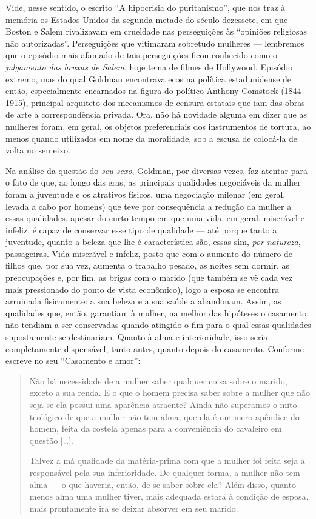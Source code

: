 Vide, nesse sentido, o escrito ``A
hipocrisia do puritanismo'', que nos traz à memória os Estados Unidos da
segunda metade do século dezessete, em que Boston e Salem rivalizavam em
crueldade nas perseguições às ``opiniões religiosas não autorizadas''. 
Perseguições que vitimaram sobretudo mulheres --- lembremos que o
episódio mais afamado de tais perseguições ficou conhecido como o
\textit{julgamento das bruxas de Salem}, hoje tema de filmes de Hollywood.
Episódio extremo, mas do qual Goldman encontrava ecos na política
estadunidense de então, especialmente encarnados na figura do político
Anthony Comstock (1844--1915), principal arquiteto dos mecanismos de
censura estatais que iam das obras de arte à correspondência privada.
Ora, não há novidade alguma em dizer que as mulheres foram, em geral, os
objetos preferenciais dos instrumentos de tortura, ao menos quando
utilizados em nome da moralidade, sob a escusa de colocá-la de volta no
seu eixo.

Na análise da questão do \textit{seu sexo}, Goldman, por diversas vezes, faz
atentar para o fato de que, ao longo das eras, as principais qualidades
negociáveis da mulher foram a juventude e os atrativos físicos, uma
negociação milenar (em geral, levada a cabo por homens) que teve por
consequência a redução da mulher a essas qualidades, apesar do curto
tempo em que uma vida, em geral, miserável e infeliz, é capaz de
conservar esse tipo de qualidade --- até porque tanto a juventude, quanto
a beleza que lhe é característica são, essas sim, \textit{por natureza},
passageiras. Vida miserável e infeliz, posto que com o aumento do número
de filhos que, por sua vez, aumenta o trabalho pesado, as noites sem
dormir, as preocupações e, por fim, as brigas com o marido (que também
se vê cada vez mais pressionado do ponto de vista econômico), logo a
esposa se encontra arruinada fisicamente: a sua beleza e a sua saúde a
abandonam. Assim, as qualidades que, então, garantiam à mulher, na
melhor das hipóteses o casamento, não tendiam a ser conservadas quando
atingido o fim para o qual essas qualidades supostamente se destinariam.
Quanto à alma e interioridade, isso seria completamente dispensável,
tanto antes, quanto depois do casamento. Conforme escreve no seu
``Casamento e amor'':

\begin{quote}
Não há necessidade de a mulher saber qualquer coisa sobre o marido,
exceto a sua renda. E o que o homem precisa saber sobre a mulher que não
seja se ela possui uma aparência atraente? Ainda não superamos o mito
teológico de que a mulher não tem alma, que ela é um mero apêndice do
homem, feita da costela apenas para a conveniência do cavaleiro em
questão {[}\ldots{]}.

Talvez a má qualidade da matéria-prima com que a mulher foi feita seja a
responsável pela sua inferioridade. De qualquer forma, a mulher não tem
alma --- o que haveria, então, de se saber sobre ela? Além disso, quanto
menos alma uma mulher tiver, mais adequada estará à condição de esposa,
mais prontamente irá se deixar absorver em seu marido.
\end{quote}

